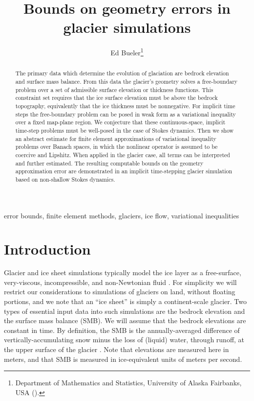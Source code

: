 \documentclass[hidelinks,onefignum,onetabnum,final]{siamart220329}  %
\title{Bounds on geometry errors in glacier simulations}
\author{Ed Bueler\thanks{Department of Mathematics and Statistics, University of Alaska Fairbanks, USA (\email{elbueler@alaska.edu}).}}
\begin{document}
\maketitle

\begin{abstract}
The primary data which determine the evolution of glaciation are bedrock elevation and surface mass balance.  From this data the glacier's geometry solves a free-boundary problem over a set of admissible surface elevation or thickness functions.  This constraint set requires that the ice surface elevation must be above the bedrock topography, equivalently that the ice thickness must be nonnegative.  For implicit time steps the free-boundary problem can be posed in weak form as a variational inequality over a fixed map-plane region.  We conjecture that these continuous-space, implicit time-step problems must be well-posed in the case of Stokes dynamics.  Then we show an abstract estimate for finite element approximations of variational inequality problems over Banach spaces, in which the nonlinear operator is assumed to be coercive and Lipshitz.  When applied in the glacier case, all terms can be interpreted and further estimated.  The resulting computable bounds on the geometry approximation error are demonstrated in an implicit time-stepping glacier simulation based on non-shallow Stokes dynamics.
\end{abstract}

\begin{keywords}
error bounds, finite element methods, glaciers, ice flow, variational inequalities
\end{keywords}



\section{Introduction} \label{sec:intro}

Glacier and ice sheet simulations typically model the ice layer as a free-surface, very-viscous, incompressible, and non-Newtonian fluid \cite{GreveBlatter2009,SchoofHewitt2013}.  For simplicity we will restrict our considerations to simulations of glaciers on land, without floating portions, and we note that an ``ice sheet'' is simply a continent-scale glacier.  Two types of essential input data into such simulations are the bedrock elevation and the surface mass balance (SMB).  We will assume that the bedrock elevations are constant in time.  By definition, the SMB is the annually-averaged difference of vertically-accumulating snow minus the loss of (liquid) water, through runoff, at the upper surface of the glacier \cite{Cogleyetal2011}.  Note that elevations are measured here in meters, and that SMB is measured in ice-equivalent units of meters per second.
\end{document}
